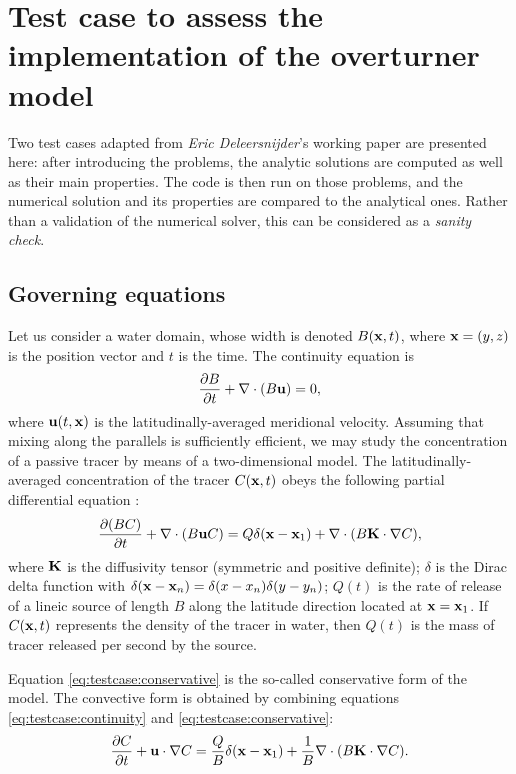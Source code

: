 \section{Test case to assess the implementation of the overturner model} \label{app:test_case}
Two test cases adapted from \textit{Eric Deleersnijder}'s working paper \cite{deleersnijder2011test} are presented here: after introducing the problems, the analytic solutions are computed as well as their main properties. The code is then run on those problems, and the numerical solution and its properties are compared to the analytical ones. Rather than a validation of the numerical solver, this can be considered as a \textit{sanity check}.

\subsection{Governing equations}
Let us consider a water domain, whose width is denoted $B(\mathbf{x},t)$, where $\mathbf{x} = (y,z)$ is the position vector and $t$ is the time. The continuity equation is
\begin{equation} \label{eq:testcase:continuity}
	\frac{\partial B}{\partial t} + \nabla \cdot (B\mathbf{u}) = 0,
\end{equation}
where $\mathbf{u}(t,\mathbf{x})$ is the latitudinally-averaged meridional velocity. Assuming that mixing along the parallels is sufficiently efficient, we may study the concentration of a passive tracer by means of a two-dimensional model. The latitudinally-averaged concentration of the tracer $C(\mathbf x, t)$ obeys the following partial differential equation :
\begin{equation} \label{eq:testcase:conservative}
	\frac{\partial (BC)}{\partial t} + \nabla \cdot (B \mathbf{u} C) = Q\delta(\mathbf{x} - \mathbf{x}_1) + \nabla \cdot (B\mathbf{K} \cdot \nabla C), 
\end{equation}
where $\mathbf{K}$ is the diffusivity tensor (symmetric and positive definite); $\delta$ is the Dirac delta function with $\delta(\mathbf{x}-\mathbf{x}_n) = \delta(x-x_n)\delta(y-y_n)$; $Q(t)$ is the rate of release of a lineic source of length $B$ along the latitude direction located at $\mathbf{x} = \mathbf{x}_1$. If $C(\mathbf x,t)$ represents the 
density of the tracer in water, then $Q(t)$ is the mass of tracer released per second by the source.

Equation \eqref{eq:testcase:conservative} is the so-called conservative form of the model. The convective form is obtained by combining equations \eqref{eq:testcase:continuity} and \eqref{eq:testcase:conservative}:
\begin{equation}  \label{eq:testcase:convective}
	\frac{\partial C}{\partial t} + \mathbf{u} \cdot \nabla C = \frac{Q}{B} \delta(\mathbf{x} - \mathbf{x}_1) + \frac{1}{B} \nabla \cdot (B\mathbf{K} \cdot \nabla C).
\end{equation}

